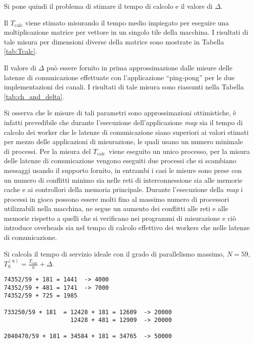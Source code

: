 \documentclass[a4paper]{article}
\newcommand{\Tcalc}{$T_{\textrm{calc}}$}
\newcommand{\inTcalc}{T_{\textrm{calc}}}
\newcommand{\inTs}{T_{\textrm{S}}^{(\textrm{n})}}
\begin{document}
Si pone quindi il problema di stimare il tempo di calcolo e il valore di $\Delta$. 
\begin{asparaitem}
\item Il $T_{\textrm{calc}}$ viene stimato misurando il tempo medio impiegato per eseguire una moltiplicazione matrice per vettore in un singolo tile della macchina. I risultati di tale misura per dimensioni diverse della matrice sono mostrate in Tabella \ref{tab:Tcalc}.
\item Il valore di $\Delta$ pu\`o essere fornito in prima approssimazione dalle misure delle latenze di comunicazione effettuate con l'applicazione ``ping-pong'' per le due implementazioni dei canali. I risultati di tale misura sono riassunti nella Tabella \ref{tab:ch_and_delta}.
\end{asparaitem}
Si osserva che le misure di tali parametri sono approssimazioni ottimistiche, \`e infatti prevedibile che durante l'esecuzione dell'applicazione \emph{map} sia il tempo di calcolo dei worker che le latenze di comunicazione siano superiori ai valori stimati per mezzo delle applicazioni di misurazione, le quali usano un numero minimale di processi. Per la misura del \Tcalc\ viene eseguito un unico processo, per la misura delle latenze di comunicazione vengono eseguiti due processi che si scambiano messaggi usando il supporto fornito, in entrambi i casi le misure sono prese con un numero di conflitti minimo sia nelle reti di interconnessione sia alle memorie cache e ai controllori della memoria principale. Durante l'esecuzione della \emph{map} i processi in gioco possono essere molti fino al massimo numero di processori utilizzabili nella macchina, ne segue un aumento dei conflitti alle reti e alle memorie rispetto a quelli che si verificano nei programmi di misurazione e ci\`o introduce overheads sia nel tempo di calcolo effettivo dei workers che nelle latenze di comunicazione.

Si calcola il tempo di servizio ideale con il grado di parallelismo massimo, $N = 59$, $\inTs = \frac{\inTcalc}{n} + \Delta$.

\begin{verbatim}
74352/59 + 181 = 1441  -> 4000
74352/59 + 481 = 1741  -> 7000
74352/59 + 725 = 1985

733250/59 + 181  = 12428 + 181 = 12609  -> 20000
                   12428 + 481 = 12909  -> 20000

2040470/59 + 181 = 34584 + 181 = 34765  -> 50000
\end{verbatim}
\end{document}
